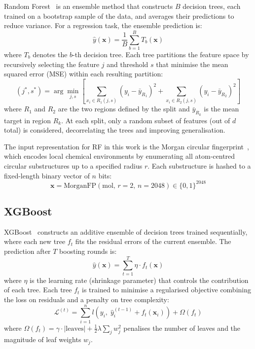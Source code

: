 \documentclass[journal=jcisd8,manuscript=suppinfo]{achemso}
\newcommand{\vect}[1]{\mathbf{#1}}
\begin{document}
Random Forest~\cite{breiman2001random} is an ensemble method that constructs $B$ decision trees, each trained on a bootstrap sample of the data, and averages their predictions to reduce variance. For a regression task, the ensemble prediction is:
\begin{equation}
 \hat{y}(\vect{x}) = \frac{1}{B} \sum_{b=1}^{B} T_b(\vect{x})
 \label{eq:si_rf_predict}
\end{equation}
where $T_b$ denotes the $b$-th decision tree. Each tree partitions the feature space by recursively selecting the feature $j$ and threshold $s$ that minimise the mean squared error (MSE) within each resulting partition:
\begin{equation}
 (j^*, s^*) = \arg\min_{j, s} \left[ \sum_{x_i \in R_1(j,s)} (y_i - \bar{y}_{R_1})^2 + \sum_{x_i \in R_2(j,s)} (y_i - \bar{y}_{R_2})^2 \right]
 \label{eq:si_rf_split}
\end{equation}
where $R_1$ and $R_2$ are the two regions defined by the split and $\bar{y}_{R_k}$ is the mean target in region $R_k$. At each split, only a random subset of features (out of $d$ total) is considered, decorrelating the trees and improving generalisation.

The input representation for RF in this work is the Morgan circular fingerprint~\cite{rogers2010extended}, which encodes local chemical environments by enumerating all atom-centred circular substructures up to a specified radius $r$. Each substructure is hashed to a fixed-length binary vector of $n$ bits:
\begin{equation}
 \vect{x} = \text{MorganFP}(\text{mol},\, r=2,\, n=2048) \in \{0, 1\}^{2048}
 \label{eq:si_morgan_fp}
\end{equation}

\subsection*{XGBoost}

XGBoost~\cite{chen2016xgboost} constructs an additive ensemble of decision trees trained sequentially, where each new tree $f_t$ fits the residual errors of the current ensemble. The prediction after $T$ boosting rounds is:
\begin{equation}
 \hat{y}(\vect{x}) = \sum_{t=1}^{T} \eta \cdot f_t(\vect{x})
 \label{eq:si_xgb_predict}
\end{equation}
where $\eta$ is the learning rate (shrinkage parameter) that controls the contribution of each tree. Each tree $f_t$ is trained to minimise a regularised objective combining the loss on residuals and a penalty on tree complexity:
\begin{equation}
 \mathcal{L}^{(t)} = \sum_{i=1}^{n} l\!\left(y_i,\; \hat{y}_i^{(t-1)} + f_t(\vect{x}_i)\right) + \Omega(f_t)
 \label{eq:si_xgb_loss}
\end{equation}
where $\Omega(f_t) = \gamma \cdot |\text{leaves}| + \tfrac{1}{2}\lambda \sum_j w_j^2$ penalises the number of leaves and the magnitude of leaf weights $w_j$.
\end{document}
